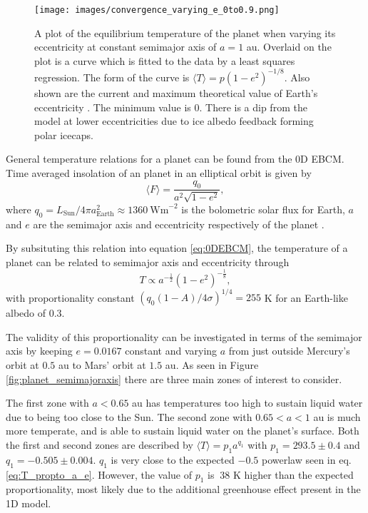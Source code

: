 \documentclass[12pt, onecolumn]{revtex4-2}    %
\begin{document}
\begin{figure}
  \texttt{[image: images/convergence\_varying\_e\_0to0.9.png]}
  \caption{
    A plot of the equilibrium temperature of the planet when varying its eccentricity at constant semimajor axis of $a = 1$ au.
    Overlaid on the plot is a curve which is fitted to the data by a least squares regression.
    The form of the curve is $\langle T \rangle = p(1-e^2)^{-1/8}$.
    Also shown are the current and maximum theoretical value of Earth's eccentricity \cite{LA2010}.
    The minimum value is $0$.
    There is a dip from the model at lower eccentricities due to ice albedo feedback forming polar icecaps.
  }
  \label{fig:planet_eccentricity}
\end{figure}

General temperature relations for a planet can be found from the 0D EBCM.
Time averaged insolation of an planet in an elliptical orbit is given by
\begin{equation}
  \langle F \rangle = \frac{q_0}{a^2 \sqrt{1-e^2}} \label{eq:avgInsolation},
\end{equation}
where $q_0 = L_{\text{Sun}}/4\pi a_{\text{Earth}}^2 \approx 1360 \ \text{Wm}^{-2}$ is the bolometric solar flux for Earth, $a$ and $e$ are the semimajor axis and eccentricity respectively of the planet \cite{Mendez2017}.

By subsituting this relation into equation \eqref{eq:0DEBCM}, the temperature of a planet can be related to semimajor axis and eccentricity through
\begin{equation}
  T \propto a^{-\frac{1}{2}} (1-e^2)^{-\frac{1}{8}}, \label{eq:T_propto_a_e}
\end{equation}
with proportionality constant $(q_0 (1-A) / 4\sigma)^{1/4} = 255$ K for an Earth-like albedo of 0.3.


The validity of this proportionality can be investigated in terms of the semimajor axis by keeping $e = 0.0167$ constant and varying $a$ from just outside Mercury's orbit at $0.5$ au to Mars' orbit at $1.5$ au.
As seen in Figure \ref{fig:planet_semimajoraxis} there are three main zones of interest to consider.

The first zone with $a < 0.65$ au has temperatures too high to sustain liquid water due to being too close to the Sun.
The second zone with $0.65 < a < 1$ au is much more temperate, and is able to sustain liquid water on the planet's surface.
Both the first and second zones are described by $\langle T \rangle = p_1 a^{q_1}$ with $p_1 = 293.5 \pm 0.4$ and $q_1= -0.505 \pm 0.004$. $q_1$ is very close to the expected $-0.5$ powerlaw seen in eq. \eqref{eq:T_propto_a_e}.
However, the value of $p_1$ is $~38$ K higher than the expected proportionality, most likely due to the additional greenhouse effect present in the 1D model.
\end{document}
